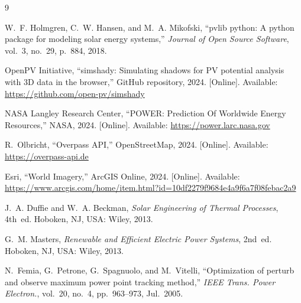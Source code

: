 \documentclass[conference]{IEEEtran}
\begin{document}
\begin{thebibliography}{9}

W.~F. Holmgren, C.~W. Hansen, and M.~A. Mikofski,
``pvlib python: A python package for modeling solar energy systems,''
\emph{Journal of Open Source Software}, vol.~3, no.~29, p.~884, 2018.

OpenPV Initiative, ``simshady: Simulating shadows for PV potential analysis with 3D data in the browser,'' GitHub repository, 2024. [Online]. Available: \url{https://github.com/open-pv/simshady}

NASA Langley Research Center, ``POWER: Prediction Of Worldwide Energy Resources,'' NASA, 2024. [Online]. Available: \url{https://power.larc.nasa.gov}

R.~Olbricht, ``Overpass API,'' OpenStreetMap, 2024. [Online]. Available: \url{https://overpass-api.de}

Esri, ``World Imagery,'' ArcGIS Online, 2024. [Online]. Available: \url{https://www.arcgis.com/home/item.html?id=10df2279f9684e4a9f6a7f08febac2a9}

J.~A. Duffie and W.~A. Beckman,
\emph{Solar Engineering of Thermal Processes}, 4th~ed.
Hoboken, NJ, USA: Wiley, 2013.

G.~M. Masters,
\emph{Renewable and Efficient Electric Power Systems}, 2nd~ed.
Hoboken, NJ, USA: Wiley, 2013.

N.~Femia, G.~Petrone, G.~Spagnuolo, and M.~Vitelli,
``Optimization of perturb and observe maximum power point tracking method,''
\emph{IEEE Trans. Power Electron.}, vol.~20, no.~4, pp.~963--973, Jul.~2005.

\end{thebibliography}
\end{document}

